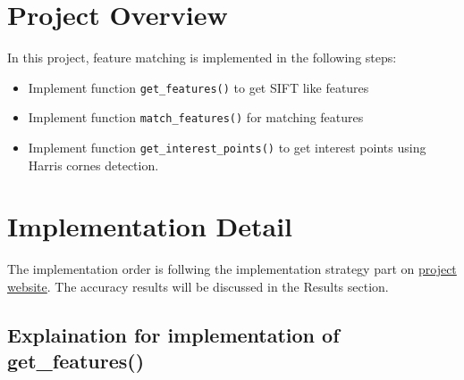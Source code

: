 
\section*{Project Overview}

In this project, feature matching is implemented in the following steps:

\begin{itemize}
    \item Implement function \verb|get_features()| to get SIFT like features
    \item Implement function \verb|match_features()| for matching features
    \item Implement function \verb|get_interest_points()| to get interest points using Harris cornes detection.
\end{itemize}

\section*{Implementation Detail}
 
The implementation order is follwing the implementation strategy part on \href{https://browncsci1430.github.io/webpage/proj2_featurematching/}{project website}. The accuracy results will be discussed in the Results section.

\subsection*{Explaination for implementation of get\_features()}


